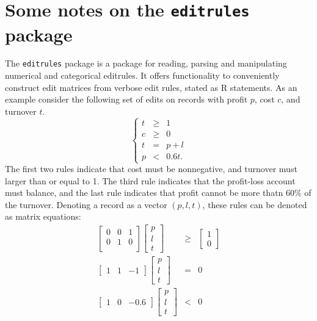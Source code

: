 \documentclass[11pt, fleqn, a4paper]{article}
\begin{document}



\newpage
\appendix
\section{Some notes on the {\tt editrules} package}
The {\tt editrules} package \citep{jonge:2011} is a package for reading, parsing and
manipulating numerical and categorical editrules. It offers functionality to
conveniently construct edit matrices from verbose edit rules, stated as 
R statements. As an example consider the following set of edits on 
records with profit $p$, cost $c$, and turnover $t$.
\begin{equation}
\left\{\begin{array}{lcl}
t &\geq& 1\\
c &\geq& 0\\
t &=& p + l \\
p &<& 0.6t.  
\end{array}\right.
\end{equation}
The first two rules indicate that cost must be nonnegative, and turnover must
larger than or equal to 1. The third rule indicates that the profit-loss
account must balance, and the last rule indicates that profit cannot be more
thatn 60\% of the turnover. Denoting a record as a vector $(p,l,t)$,  these
rules can be denoted as matrix equations:
\begin{eqnarray}
\left[\begin{array}{ccc}
0 & 0 & 1\\
0 & 1 & 0\\
\end{array}\right]
\left[\begin{array}{c}p\\l\\t\end{array}\right] &\geq& 
\left[\begin{array}{c}1\\0\end{array}\right]\\
\left[\begin{array}{ccc}
1 & 1 & -1
\end{array}\right]
\left[\begin{array}{c}p\\l\\t\end{array}\right] &=& 0\\
\left[\begin{array}{ccc}
1 & 0 & -0.6
\end{array}\right] 
\left[\begin{array}{c}p\\l\\t\end{array}\right] &<& 0
\end{eqnarray}
\end{document}
